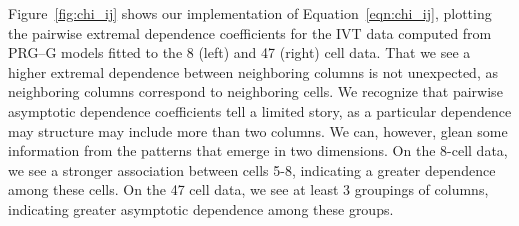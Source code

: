 Figure~\ref{fig:chi_ij} shows our implementation of Equation~\ref{eqn:chi_ij}, plotting the 
  pairwise extremal dependence coefficients for the IVT data computed from PRG--G models 
  fitted to the 8 (left) and 47 (right) cell data.  
  That we see a higher extremal dependence between neighboring columns is not unexpected, as
  neighboring columns correspond to neighboring cells.  We recognize that pairwise asymptotic
  dependence coefficients tell a limited story, as a particular dependence may structure may include
  more than two columns.   We can, however, glean some information from the patterns that emerge in
  two dimensions.  On the 8-cell data, we see a stronger association between cells 5-8, indicating a
  greater dependence among these cells.  On the 47 cell data, we see at least 3 groupings of columns,
  indicating greater asymptotic dependence among these groups.

 
